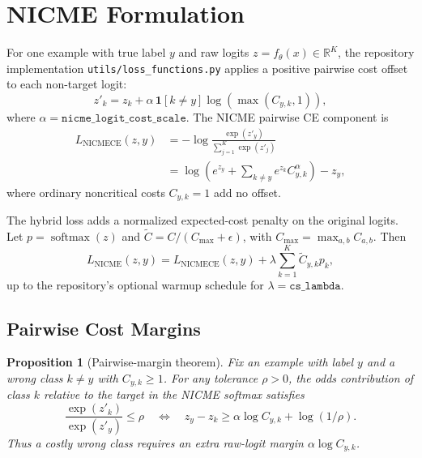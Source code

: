 \documentclass[11pt]{article}
\newcommand{\code}[1]{\texttt{#1}}
\newcommand{\pathref}[1]{\texttt{\small #1}}
\newcommand{\softmax}{\operatorname{softmax}}
\newcommand{\R}{\mathbb{R}}
\newcommand{\I}{\mathbf{1}}
\theoremstyle{definition}
\theoremstyle{plain}
\newtheorem{proposition}{Proposition}
\theoremstyle{remark}
\begin{document}
\section{NICME Formulation}

For one example with true label $y$ and raw logits $z=f_\theta(x)\in\R^K$, the repository implementation
\pathref{utils/loss\_functions.py} applies a positive pairwise cost offset to each non-target logit:
\begin{equation}
  z'_k
  =
  z_k+\alpha\,\I[k\ne y]\log\left(\max(C_{y,k},1)\right),
  \label{eq:nicme-adjusted-logits}
\end{equation}
where $\alpha=\code{nicme\_logit\_cost\_scale}$.
The NICME pairwise CE component is
\begin{align}
  L_{\mathrm{NICMECE}}(z,y)
  &=
  -\log
  \frac{\exp(z'_y)}{\sum_{j=1}^K \exp(z'_j)}
  \nonumber\\
  &=
  \log\left(
    e^{z_y}
    +
    \sum_{k\ne y} e^{z_k} C_{y,k}^{\alpha}
  \right)-z_y,
  \label{eq:nicme-ce}
\end{align}
where ordinary noncritical costs $C_{y,k}=1$ add no offset.

The hybrid loss adds a normalized expected-cost penalty on the original logits.
Let $p=\softmax(z)$ and $\tilde C=C/(C_{\max}+\epsilon)$, with
$C_{\max}=\max_{a,b}C_{a,b}$.
Then
\begin{equation}
  L_{\mathrm{NICME}}(z,y)
  =
  L_{\mathrm{NICMECE}}(z,y)
  +
  \lambda
  \sum_{k=1}^{K}\tilde C_{y,k}p_k,
  \label{eq:nicme-loss}
\end{equation}
up to the repository's optional warmup schedule for $\lambda=\code{cs\_lambda}$.

\subsection{Pairwise Cost Margins}

\begin{proposition}[Pairwise-margin theorem]
Fix an example with label $y$ and a wrong class $k\ne y$ with $C_{y,k}\ge 1$.
For any tolerance $\rho>0$, the odds contribution of class $k$ relative to the target in the NICME softmax satisfies
\begin{equation}
  \frac{\exp(z'_k)}{\exp(z'_y)}\le \rho
  \quad\Longleftrightarrow\quad
  z_y-z_k \ge \alpha\log C_{y,k}+\log(1/\rho).
  \label{eq:margin-equivalence}
\end{equation}
Thus a costly wrong class requires an extra raw-logit margin
$\alpha\log C_{y,k}$.
\end{proposition}
\end{document}
